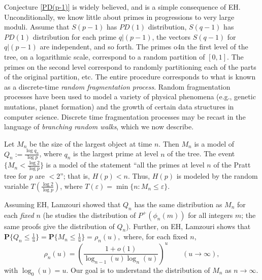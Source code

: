\documentclass[12pt]{amsart}
\theoremstyle{remark}
\theoremstyle{plain}
\numberwithin{equation}{section}
\newcommand{\PPP}{\mathbf P}
\newcommand{\be}{\begin{equation}}
\newcommand{\ee}{\end{equation}}
\newcommand{\eps}{\ensuremath{\varepsilon}}
\renewcommand{\(}{\left(}
\renewcommand{\)}{\right)}
\newcommand{\pfrac}[2]{\left(\frac{#1}{#2}\right)}
\renewcommand{\le}{\leqslant}
\begin{document}
Conjecture \ref{PD(p-1)} is widely believed, and is a simple consequence of
EH.   Unconditionally, we know little about
primes in progressions to very large moduli. 
Assume that $S(p-1)$ has $PD(1)$ distribution, 
$S(q-1)$ has $PD(1)$ distribution for each prime $q|(p-1)$, the vectors $S(q-1)$ for $q|(p-1)$
are independent, and so forth.  The primes o4n the
first level of the tree, on a logarithmic scale,
correspond to a random partition of $[0,1]$.  The primes on the second
level correspond to randomly partitioning  each of the parts of the
original partition, etc.  The entire procedure corresponds to
what is known as a discrete-time \emph{random fragmentation process}.  Random fragmentation processes have been used to model a variety of physical phenomena
(e.g., genetic mutations, planet formation) and
the growth of certain data structures in computer science.
Discrete time fragmentation processes may be
recast in the language of \emph{branching random walks}, which we now
describe.

Let $M_n$ be the size of the largest object at time $n$. 
Then $M_n$ is a model of $Q_n :=\frac{\log q_n}{\log p}$, where $q_n$
 is the largest prime at level $n$ of the tree.
The event
$\{ M_n < \frac{\log 2}{\log p} \}$ is a model of the statement
``all the primes at level $n$ of the Pratt tree for $p$ are $< 2$'';
that is, $H(p)<n$.  Thus, $H(p)$ is modeled by the random variable
$T(\frac{\log 2}{\log p})$, where 
$T(\eps) = \min \{n : M_n \le \eps \}. $

Assuming EH,
Lamzouri \cite{Lam} showed that $Q_n$ has the same distribution
as $M_n$ for each \emph{fixed} $n$ (he studies the distribution
of $P^+(\phi_n(m))$ for all integers $m$; the same
proofs give the distribution of $Q_n$).  Further,
on  EH, Lamzouri shows that
$\PPP \{ Q_n \le \frac{1}{u} \} = \PPP \{ M_n \le \frac{1}{u} \} = \rho_n(u),$
where, for each fixed $n$,
\be\label{Lamtail}
\rho_n(u) = \pfrac{1+o(1)}{\log_{n-1} (u) \log_n (u)}^u \qquad (u\to \infty),
\ee
with $\log_0 (u) = u$.
Our goal is to understand the distribution of $M_n$ as
$n\to\infty$.  
\end{document}

